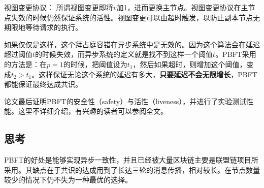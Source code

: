 视图变更协议：	所谓视图变更即将$v$加1，进而更换主节点。视图变更协议在主节点失效的时候仍然保证系统的活性。视图变更可以由超时触发，以防止副本节点无期限地等待请求的执行。

如果仅仅是这样，这个拜占庭容错在异步系统中是无效的。因为这个算法会在延迟超过阈值$t$的时候失效，而异步系统的定义就是找不到这样一个阈值$t$。PBFT采用的方法是：在$p=1$的时候，把阈值设为$t_1$，然后如果超时，则增加这个阈值，变成$t_2>t_1$。这样保证无论这个系统的延迟有多大，\textbf{只要延迟不会无限增长}，PBFT都能保证最终达成共识。

论文最后证明PBFT的安全性（safety）与活性（liveness），并进行了实验测试性能。这里不详细介绍，有兴趣的读者可以参阅全文。

\subsection{思考}
PBFT的好处是能够实现异步一致性，并且已经被大量区块链主要是联盟链项目所采用。其缺点在于共识的达成用到了长达三轮的消息传播，相对较长。在节点数量较少的情况下仍不失为一种最优的选择。
